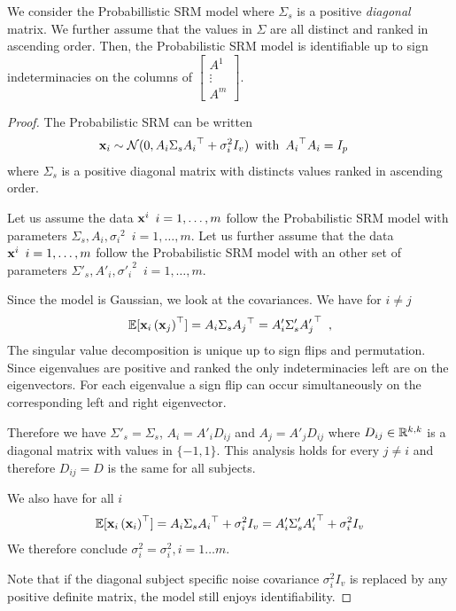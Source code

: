 \documentclass{article}
\begin{document}
\begin{proposition}
We consider the Probabillistic SRM model where $\Sigma_s$ is a positive \emph{diagonal} matrix. We further assume that the values in $\Sigma$ are all distinct and ranked in ascending order.
Then, the Probabilistic SRM model is identifiable up to sign indeterminacies on the columns of
$\begin{bmatrix}
A^1 \\
\vdots \\
A^m
\end{bmatrix}
$.
\end{proposition}
\begin{proof}
The Probabilistic SRM can be written
\begin{align*}
    &\mathbf{x}_i \sim \mathcal{N}(0, A_i \Sigma_s {A_i}^{\top} + \sigma_i^2 I_v) \enspace \text{with}\enspace  {A_i}^{\top}A_i = I_p
\end{align*}
where $\Sigma_s$ is a positive diagonal matrix with distincts values ranked in ascending order.

Let us assume the data $\mathbf{x}^i \enspace i=1, \dots, m$ follow the Probabilistic SRM model with parameters $\Sigma_s, A_i, {\sigma_i}^2 \enspace i=1, \dots, m$. Let us further assume that the data $\mathbf{x}^i \enspace i=1, \dots, m$ follow the Probabilistic SRM model with an other set of parameters $\Sigma'_s, A'_i, {\sigma'_i}^2 \enspace i=1, \dots, m$.

Since the model is Gaussian, we look at the covariances.
We have for $i \neq j$
\begin{align*}
    \mathbb{E}[\mathbf{x}_i\left(\mathbf{x}_j\right)^{\top}] = A_i\Sigma_s {A_j}^{\top} = A'_i \Sigma'_s{A'_j}^{\top} \enspace,
\end{align*}
The singular value decomposition is unique up to sign flips and permutation. Since eigenvalues are positive and ranked the only indeterminacies left are on the eigenvectors. For each eigenvalue a sign flip can occur simultaneously on the corresponding left and right eigenvector.

Therefore we have $\Sigma'_s = \Sigma_s$, $A_i = A'_i D_{ij}$ and $A_j = A'_j D_{ij}$ where $D_{ij} \in \mathbb{R}^{k, k}$ is a diagonal matrix with values in $\{-1, 1\}$. This analysis holds for every $j \neq i$ and therefore $D_{ij} = D$ is the same for all subjects.

We also have for all $i$
\begin{align*}
    \mathbb{E}[\mathbf{x}_i \left(\mathbf{x}_i\right)^{\top}] = A_i \Sigma_s {A_i}^{\top} + \sigma_i^2 I_v =  A'_i \Sigma'_s {A'_i}^{\top}  + {\sigma}_i^2 I_v\\
\end{align*}
We therefore conclude ${\sigma}_i^2 = \sigma_i^2, i=1 \dots m$.

Note that if the diagonal subject specific noise covariance $\sigma_i^2 I_v$ is replaced by any positive definite matrix, the model still enjoys identifiability.
\end{proof}
\end{document}
